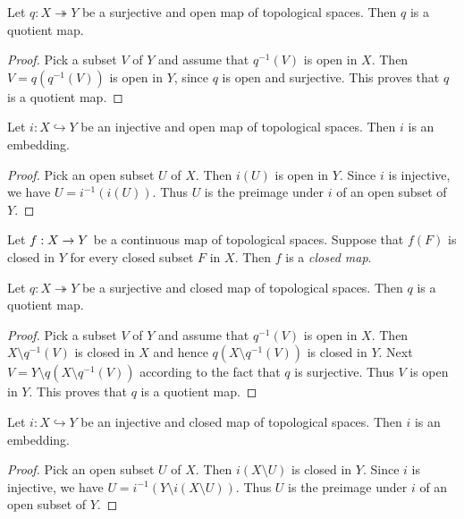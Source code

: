 \begin{fact}\label{fact:open_surjective_maps_are_quotient_maps}
	Let $q:X \twoheadrightarrow Y$ be a surjective and open map of topological spaces. Then $q$ is a quotient map.
\end{fact}
\begin{proof}
	Pick a subset $V$ of $Y$ and assume that $q^{-1}(V)$ is open in $X$. Then $V = q\left(q^{-1}(V)\right)$ is open in $Y$, since $q$ is open and surjective. This proves that $q$ is a quotient map.
\end{proof}

\begin{fact}\label{fact:open_injective_maps_are_embeddings}
	Let $i:X \hookrightarrow Y$ be an injective and open map of topological spaces. Then $i$ is an embedding.
\end{fact}
\begin{proof}
	Pick an open subset $U$ of $X$. Then $i(U)$ is open in $Y$. Since $i$ is injective, we have $U = i^{-1}\left(i(U)\right)$. Thus $U$ is the preimage under $i$ of an open subset of $Y$.
\end{proof}

\begin{definition}
	Let $f:X \rightarrow Y$ be a continuous map of topological spaces. Suppose that $f(F)$ is closed in $Y$ for every closed subset $F$ in $X$. Then $f$ is a \textit{closed map}.
\end{definition}

\begin{fact}\label{fact:closed_surjective_maps_are_quotient_maps}
	Let $q:X \twoheadrightarrow Y$ be a surjective and closed map of topological spaces. Then $q$ is a quotient map.
\end{fact}
\begin{proof}
	Pick a subset $V$ of $Y$ and assume that $q^{-1}(V)$ is open in $X$. Then $X\setminus q^{-1}(V)$ is closed in $X$ and hence $q\left(X\setminus q^{-1}(V)\right)$ is closed in $Y$. Next $V = Y \setminus q\left(X\setminus q^{-1}(V)\right)$ according to the fact that $q$ is surjective. Thus $V$ is open in $Y$. This proves that $q$ is a quotient map.
\end{proof}

\begin{fact}\label{fact:closed_injective_maps_are_embeddings}
	Let $i:X \hookrightarrow Y$ be an injective and closed map of topological spaces. Then $i$ is an embedding.
\end{fact}
\begin{proof}
	Pick an open subset $U$ of $X$. Then $i(X\setminus U)$ is closed in $Y$. Since $i$ is injective, we have $U = i^{-1}\left(Y\setminus i(X\setminus U)\right)$. Thus $U$ is the preimage under $i$ of an open subset of $Y$.
\end{proof}

